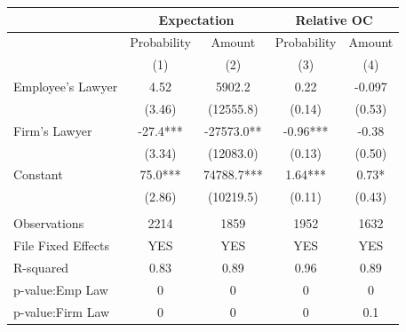 \begin{tabular}{lcccc}
\toprule
      & \multicolumn{2}{c}{Expectation} & \multicolumn{2}{c}{Relative OC} \\
\midrule
\midrule
      & Probability & Amount & Probability & Amount \\
\midrule
      & (1)   & (2)   & (3)   & (4) \\
\midrule
\midrule
Employee's Lawyer & 4.52  & 5902.2 & 0.22  & -0.097 \\
      & (3.46) & (12555.8) & (0.14) & (0.53) \\
Firm's Lawyer & -27.4*** & -27573.0** & -0.96*** & -0.38 \\
      & (3.34) & (12083.0) & (0.13) & (0.50) \\
Constant & 75.0*** & 74788.7*** & 1.64*** & 0.73* \\
      & (2.86) & (10219.5) & (0.11) & (0.43) \\
      &       &       &       &  \\
\midrule
Observations & 2214  & 1859  & 1952  & 1632 \\
File Fixed Effects & YES   & YES   & YES   & YES \\
R-squared & 0.83  & 0.89  & 0.96  & 0.89 \\
p-value:Emp Law & 0     & 0     & 0     & 0 \\
p-value:Firm Law & 0     & 0     & 0     & 0.1 \\
\bottomrule
\bottomrule
\end{tabular}%
